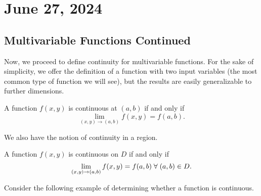 \chapter{June 27, 2024}

\section{Multivariable Functions Continued}

Now, we proceed to define continuity for multivariable functions. For the sake of simplicity, we offer the definition of a function with two input variables (the most common type of function we will see), but the results are easily generalizable to further dimensions.

\begin{definition}
    A function $f(x, y)$ is continuous at $(a, b)$ if and only if
    \[\lim_{(x, y) \to (a, b)} f(x, y) = f(a, b).\]
\end{definition}

We also have the notion of continuity in a region.

\begin{definition}
    A function $f(x, y)$ is continuous on $D$ if and only if
    \[\lim_{(x, y) \to (a, b)} f(x, y) = f(a, b) \; \forall \; (a, b) \in D.\]
\end{definition}

Consider the following example of determining whether a function is continuous.

